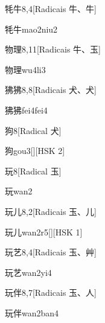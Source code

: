 \begin{entry}{牦牛}{8,4}[Radicais ⽜、⽜]
  \begin{phonetics}{牦牛}{mao2niu2}
  \end{phonetics}
\end{entry}

\begin{entry}{物理}{8,11}[Radicais ⽜、⽟]
  \begin{phonetics}{物理}{wu4li3}
  \end{phonetics}
\end{entry}

\begin{entry}{狒狒}{8,8}[Radicais ⽝、⽝]
  \begin{phonetics}{狒狒}{fei4fei4}
  \end{phonetics}
\end{entry}

\begin{entry}{狗}{8}[Radical ⽝]
  \begin{phonetics}{狗}{gou3}[][HSK 2]
  \end{phonetics}
\end{entry}

\begin{entry}{玩}{8}[Radical ⽟]
  \begin{phonetics}{玩}{wan2}
  \end{phonetics}
\end{entry}

\begin{entry}{玩儿}{8,2}[Radicais ⽟、⼉]
  \begin{phonetics}{玩儿}{wan2r5}[][HSK 1]
  \end{phonetics}
\end{entry}

\begin{entry}{玩艺}{8,4}[Radicais ⽟、⾋]
  \begin{phonetics}{玩艺}{wan2yi4}
  \end{phonetics}
\end{entry}

\begin{entry}{玩伴}{8,7}[Radicais ⽟、⼈]
  \begin{phonetics}{玩伴}{wan2ban4}
  \end{phonetics}
\end{entry}

